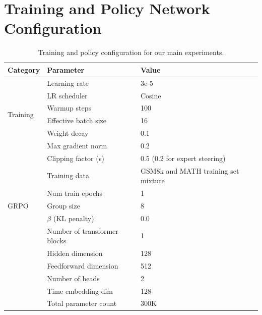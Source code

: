 \section{Training and Policy Network Configuration}
\label{sec:appendix_config}

\begin{table}[h]
\centering
\caption{Training and policy configuration for our main experiments.}
\label{tab:training-config}
\begin{tabular}{lll}
\toprule
\textbf{Category} & \textbf{Parameter} & \textbf{Value} \\
\midrule
\multirow{6}{*}{Training}
& Learning rate & 3e-5 \\
& LR scheduler & Cosine \\
& Warmup steps & 100 \\
& Effective batch size & 16 \\
& Weight decay & 0.1 \\
& Max gradient norm & 0.2 \\
& Clipping factor ($\epsilon$) & 0.5 (0.2 for expert steering) \\
\midrule
\multirow{5}{*}{GRPO}
& Training data & GSM8k and MATH training set mixture \\
& Num train epochs & 1 \\
& Group size & 8 \\
& $\beta$ (KL penalty) & 0.0 \\
\midrule
\multirow{6}{*}{Policy Network}
& Number of transformer blocks & 1 \\
& Hidden dimension & 128 \\
& Feedforward dimension & 512 \\
& Number of heads & 2 \\
& Time embedding dim & 128 \\
& Total parameter count & 300K \\
\bottomrule
\end{tabular}
\end{table}
